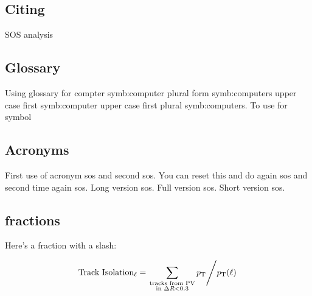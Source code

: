 \subsection{Citing}
\cite{sos} SOS analysis 
\subsection{Glossary}
Using glossary for compter \gls{symb:computer} plural form \glspl{symb:computer}
upper case first \Gls{symb:computer} upper case first plural \Glspl{symb:computer}. To use for symbol 

\subsection{Acronyms}
First use of acronym \gls{sos} and second \gls{sos}. 
You can reset this and do again  \gls{sos} and second time again \gls{sos}. 
Long version \acrlong{sos}.
Full version \acrfull{sos}.
Short version \acrshort{sos}.

\subsection{fractions}

Here's a fraction with a slash:

\begin{equation}
\text{Track Isolation}_\ell = \left.  \sum_{\substack{\text{tracks from PV}\\ \text{in } \Delta R<0.3}}p_{\mathrm{T}} \middle/ p_{\mathrm{T}}(\ell)  \right.
\end{equation}
